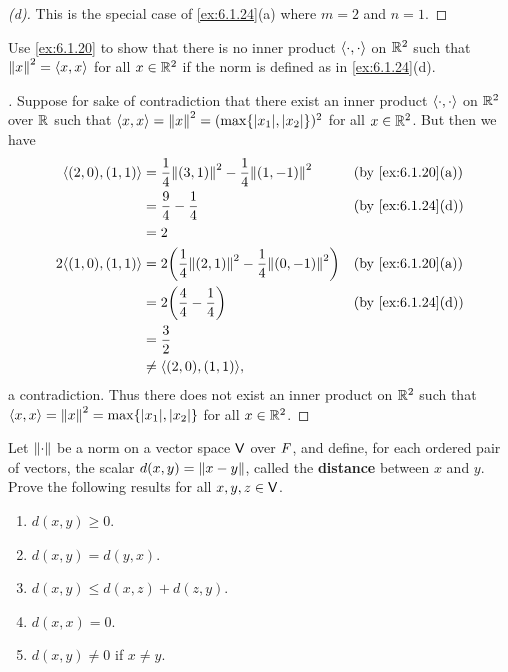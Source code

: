 \begin{proof}[(d)]
	This is the special case of \cref{ex:6.1.24}(a) where \(m = 2\) and \(n = 1\).
\end{proof}

\begin{ex}\label{ex:6.1.25}
	Use \cref{ex:6.1.20} to show that there is no inner product \(\left\langle\cdot, \cdot\right\rangle\) on \(\mathbb{R}^2\) such that \(\left\lVert x\right\rVert^2 = \left\langle x, x\right\rangle\) for all \(x \in \mathbb{R}^2\) if the norm is defined as in \cref{ex:6.1.24}(d).
\end{ex}

\begin{proof}[]
	Suppose for sake of contradiction that there exist an inner product \(\left\langle\cdot, \cdot\right\rangle\) on \(\mathbb{R}^2\) over \(\mathbb{R}\) such that \(\inn{x, x} = \norm{x}^2 = (\max\set{\abs{x_1}, \abs{x_2}})^2\) for all \(x \in \mathbb{R}^2\).
	But then we have
	\begin{align*}
		\inn{(2, 0), (1, 1)}   & = \frac{1}{4} \norm{(3, 1)}^2 - \frac{1}{4} \norm{(1, -1)}^2        &  & \by{ex:6.1.20}[a] \\
		                       & = \frac{9}{4} - \frac{1}{4}                                         &  & \by{ex:6.1.24}[d] \\
		                       & = 2                                                                                        \\
		2 \inn{(1, 0), (1, 1)} & = 2 \pa{\frac{1}{4} \norm{(2, 1)}^2 - \frac{1}{4} \norm{(0, -1)}^2} &  & \by{ex:6.1.20}[a] \\
		                       & = 2 \pa{\frac{4}{4} - \frac{1}{4}}                                  &  & \by{ex:6.1.24}[d] \\
		                       & = \frac{3}{2}                                                                              \\
		                       & \neq \inn{(2, 0), (1, 1)},
	\end{align*}
	a contradiction.
	Thus there does not exist an inner product on \(\mathbb{R}^2\) such that \(\inn{x, x} = \norm{x}^2 = \max\set{\abs{x_1}, \abs{x_2}}\) for all \(x \in \mathbb{R}^2\).
\end{proof}

\begin{ex}\label{ex:6.1.26}
	Let \(\left\lVert\cdot\right\rVert\) be a norm on a vector space \(\mathsf{V}\) over \(\mathit{F}\), and define, for each ordered pair of vectors, the scalar \(d(x, y) = \left\lVert x - y\right\rVert\), called the \textbf{distance} between \(x\) and \(y\).
	Prove the following results for all \(x, y, z \in \mathsf{V}\).
	\begin{enumerate}
		\item \(d(x, y) \geq 0\).
		\item \(d(x, y) = d(y, x)\).
		\item \(d(x, y) \leq d(x, z) + d(z, y)\).
		\item \(d(x, x) = 0\).
		\item \(d(x, y) \neq 0\) if \(x \neq y\).
	\end{enumerate}
\end{ex}

